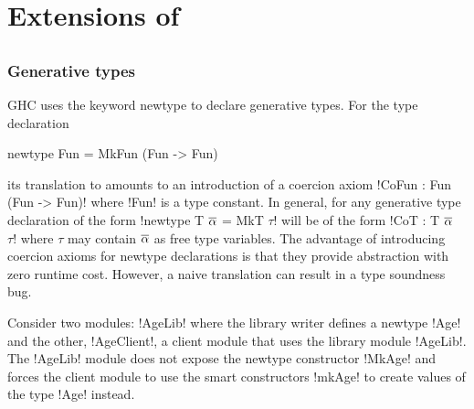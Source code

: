 \documentclass[manuscript,screen,nonacm]{acmart}
\begin{document}
\section{Extensions of \SFC}\label{sec:fc-extensions}
\subsection{\SFR}\label{sec:sfr} %
\subsubsection{Generative types}
GHC uses the keyword newtype to declare generative types. For the type declaration

\begin{CenteredBox}
\begin{code}
newtype Fun = MkFun (Fun -> Fun)
\end{code}
\end{CenteredBox}

its translation to \SFC amounts to an introduction of a coercion axiom !CoFun : Fun ~ (Fun -> Fun)! where !Fun! is a type constant. In general, for any generative type declaration of the form !newtype T $\overline{\alpha}$ = MkT $\tau$! will be of the form !CoT : T $\overline{\alpha}$ ~ $\tau$! where $\tau$ may contain $\overline{\alpha}$ as free type variables. The advantage of introducing coercion axioms for newtype declarations is that they provide abstraction with zero runtime cost. However,
a naive translation can result in a type soundness bug\cite{TODO}.

Consider two modules: !AgeLib! where the library writer defines a newtype !Age! and the other, !AgeClient!, a client module that uses the library module !AgeLib!. The !AgeLib! module does not expose the newtype constructor !MkAge! and forces the client module to use the smart constructors !mkAge! to create values of the type !Age! instead.
\end{document}
